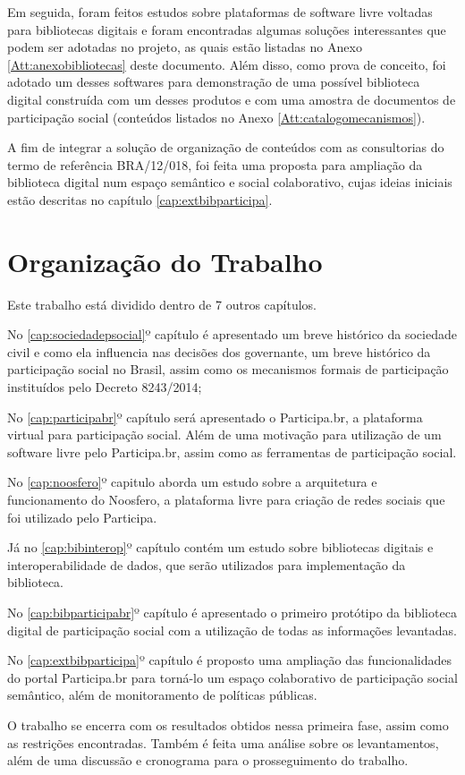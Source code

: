 Em seguida, foram feitos estudos sobre plataformas de software livre voltadas para bibliotecas digitais e foram encontradas algumas soluções interessantes que podem ser adotadas no projeto, as quais estão listadas no Anexo \ref{Att:anexobibliotecas} deste documento. Além disso, como prova de conceito, foi adotado um desses softwares para demonstração de uma possível biblioteca digital construída com um desses produtos e com uma amostra de documentos de participação social (conteúdos listados no Anexo \ref{Att:catalogomecanismos}).

A fim de integrar a solução de organização de conteúdos com as consultorias do termo de referência BRA/12/018, foi feita uma proposta para ampliação da biblioteca digital num espaço semântico e social colaborativo, cujas ideias iniciais estão descritas no capítulo \ref{cap:extbibparticipa}.

\section{Organização do Trabalho}

Este trabalho está dividido dentro de 7 outros capítulos. 

No \ref{cap:sociedadepsocial}º capítulo é apresentado um breve histórico da sociedade civil e como ela influencia nas decisões dos governante, um breve histórico da participação social no Brasil, assim como os mecanismos formais de participação instituídos pelo Decreto 8243/2014;

No \ref{cap:participabr}º capítulo será apresentado o Participa.br, a plataforma virtual para participação social. Além de uma motivação para utilização de um software livre pelo Participa.br, assim como as ferramentas de participação social.

No \ref{cap:noosfero}º capitulo aborda um estudo sobre a arquitetura e funcionamento do Noosfero, a plataforma livre para criação de redes sociais que foi utilizado pelo Participa.

Já no \ref{cap:bibinterop}º capítulo contém um estudo sobre bibliotecas digitais e interoperabilidade de dados, que serão utilizados para implementação da biblioteca.

No \ref{cap:bibparticipabr}º capítulo é apresentado o primeiro protótipo da biblioteca digital de participação social com a utilização de todas as informações levantadas.

No \ref{cap:extbibparticipa}º capítulo é proposto uma ampliação das funcionalidades do portal Participa.br para torná-lo um espaço colaborativo de participação social semântico, além de monitoramento de políticas públicas.

O trabalho se encerra com os resultados obtidos nessa primeira fase, assim como as restrições encontradas. Também é feita uma análise sobre os levantamentos, além de uma discussão e cronograma para o prosseguimento do trabalho.
